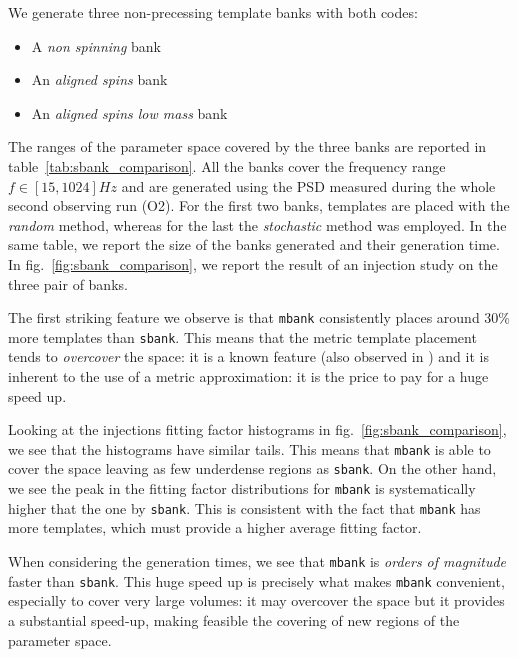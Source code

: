 \documentclass[twocolumn,showpacs,preprintnumbers,nofootinbib,prd,
superscriptaddress,10pt]{revtex4-2}
\begin{document}
We generate three non-precessing template banks with both codes:
\begin{itemize}
	\item A {\it non spinning} bank
	\item An {\it aligned spins} bank
	\item An {\it aligned spins low mass} bank
\end{itemize}
The ranges of the parameter space covered by the three banks are reported in table~\ref{tab:sbank_comparison}. All the banks cover the frequency range $f\in [15,1024] Hz$ and are generated using the PSD measured during the whole second observing run (O2).
For the first two banks, templates are placed with the {\it random} method, whereas for the last the {\it stochastic} method was employed.
In the same table, we report the size of the banks generated and their generation time. In fig.~\ref{fig:sbank_comparison}, we report the result of an injection study on the three pair of banks.

The first striking feature we observe is that \texttt{mbank} consistently places around 30\% more templates than \texttt{sbank}. This means that the metric template placement tends to \textit{overcover} the space: it is a known feature (also observed in \cite{Coogan:2022qxs}) and it is inherent to the use of a metric approximation: it is the price to pay for a huge speed up.

Looking at the injections fitting factor histograms in fig.~\ref{fig:sbank_comparison}, we see that the histograms have similar tails. This means that \texttt{mbank} is able to cover the space leaving as few underdense regions as \texttt{sbank}. On the other hand, we see the peak in the fitting factor distributions for \texttt{mbank} is systematically higher that the one by \texttt{sbank}. This is consistent with the fact that \texttt{mbank} has more templates, which must provide a higher average fitting factor.

When considering the generation times, we see that \texttt{mbank} is {\it orders of magnitude} faster than \texttt{sbank}. This huge speed up is precisely what makes \texttt{mbank} convenient, especially to cover very large volumes: it may overcover the space but it provides a substantial speed-up, making feasible the covering of new regions of the parameter space.

\end{document}
